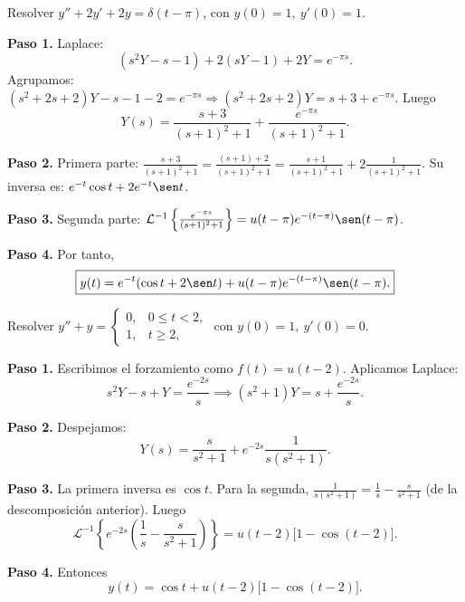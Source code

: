 \begin{example}
Resolver $y'' + 2y' + 2y = \delta(t-\pi)$, con $y(0)=1,\ y'(0)=1$.
\begin{myproof}
\textbf{Paso 1.} Laplace:
\[
(s^2Y - s - 1) + 2(sY - 1) + 2Y = e^{-\pi s}.
\]
Agrupamos: $(s^2+2s+2)Y - s - 1 - 2 = e^{-\pi s} \Rightarrow (s^2+2s+2)Y = s+3 + e^{-\pi s}$.
Luego
\[
Y(s) = \frac{s+3}{(s+1)^2+1} + \frac{e^{-\pi s}}{(s+1)^2+1}.
\]

\textbf{Paso 2.} Primera parte: $\frac{s+3}{(s+1)^2+1} = \frac{(s+1)+2}{(s+1)^2+1} = \frac{s+1}{(s+1)^2+1} + 2\frac{1}{(s+1)^2+1}$.
Su inversa es: $e^{-t}\cos t + 2e^{-t}\sen t$.

\textbf{Paso 3.} Segunda parte: $\mathcal{L}^{-1}\left\{\frac{e^{-\pi s}}{(s+1)^2+1}\right\} = u(t-\pi) e^{-(t-\pi)}\sen(t-\pi)$.

\textbf{Paso 4.} Por tanto,
\[
\boxed{y(t) = e^{-t}(\cos t + 2\sen t) + u(t-\pi)e^{-(t-\pi)}\sen(t-\pi).}
\]
\end{myproof}
\end{example}

\begin{example}
Resolver $y'' + y = \begin{cases} 0, & 0\le t<2,\\ 1, & t\ge2, \end{cases}$ con $y(0)=1,\ y'(0)=0$.
\begin{myproof}
\textbf{Paso 1.} Escribimos el forzamiento como $f(t)=u(t-2)$. Aplicamos Laplace:
\[
s^2Y - s + Y = \frac{e^{-2s}}{s} \implies (s^2+1)Y = s + \frac{e^{-2s}}{s}.
\]

\textbf{Paso 2.} Despejamos:
\[
Y(s) = \frac{s}{s^2+1} + e^{-2s}\frac{1}{s(s^2+1)}.
\]

\textbf{Paso 3.} La primera inversa es $\cos t$. Para la segunda, $\frac{1}{s(s^2+1)} = \frac{1}{s} - \frac{s}{s^2+1}$ (de la descomposición anterior). Luego
\[
\mathcal{L}^{-1}\left\{e^{-2s}\left(\frac{1}{s} - \frac{s}{s^2+1}\right)\right\} = u(t-2)\big[1 - \cos(t-2)\big].
\]

\textbf{Paso 4.} Entonces
\[
\boxed{y(t) = \cos t + u(t-2)\big[1 - \cos(t-2)\big].}
\]
\end{myproof}
\end{example}

